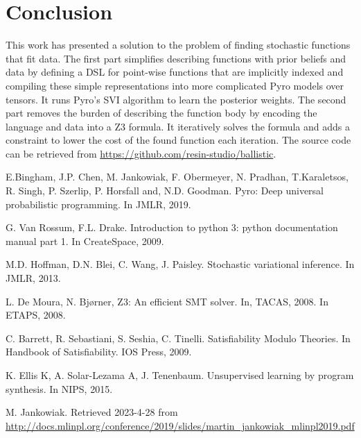 \documentclass[letterpaper]{llncs}
\begin{document}
\section{Conclusion}
This work has presented a solution to the problem of finding stochastic functions that fit data.
The first part simplifies describing functions with prior beliefs and data by defining a DSL for
point-wise functions that are implicitly indexed and compiling these simple representations
into more complicated Pyro models over tensors. It runs Pyro's SVI algorithm to learn the posterior weights. 
The second part removes the burden of describing the function body by encoding the language and data into a Z3 formula. 
It iteratively solves the formula and adds a constraint to lower the cost of the found function each iteration.  
The source code can be retrieved from \url{https://github.com/resin-studio/ballistic}.

\newpage

\begin{thebibliography}{9}

E.Bingham, J.P. Chen, M. Jankowiak, F. Obermeyer, N. Pradhan, T.Karaletsos, R. Singh, P. Szerlip, P. Horsfall and, N.D. Goodman. Pyro: Deep universal probabilistic programming. In JMLR, 2019. 

G. Van Rossum, F.L. Drake. Introduction to python 3: python documentation manual part 1. In CreateSpace, 2009.

M.D. Hoffman, D.N. Blei, C. Wang, J. Paisley. Stochastic variational inference. In JMLR, 2013.

L. De Moura, N. Bjørner, Z3: An efficient SMT solver. In, TACAS, 2008. In ETAPS, 2008.

C. Barrett, R. Sebastiani, S. Seshia, C. Tinelli. Satisfiability Modulo Theories. In
Handbook of Satisfiability. IOS Press, 2009.

K. Ellis K, A. Solar-Lezama A, J. Tenenbaum. Unsupervised learning by program synthesis. In NIPS, 2015.

M. Jankowiak. Retrieved 2023-4-28 from \url{http://docs.mlinpl.org/conference/2019/slides/martin_jankowiak_mlinpl2019.pdf} 


\end{thebibliography}
\end{document}
